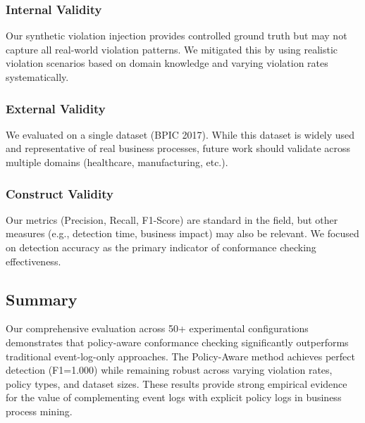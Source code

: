 \subsubsection{Internal Validity}
Our synthetic violation injection provides controlled ground truth but may not capture all real-world violation patterns. We mitigated this by using realistic violation scenarios based on domain knowledge and varying violation rates systematically.

\subsubsection{External Validity}
We evaluated on a single dataset (BPIC 2017). While this dataset is widely used and representative of real business processes, future work should validate across multiple domains (healthcare, manufacturing, etc.).

\subsubsection{Construct Validity}
Our metrics (Precision, Recall, F1-Score) are standard in the field, but other measures (e.g., detection time, business impact) may also be relevant. We focused on detection accuracy as the primary indicator of conformance checking effectiveness.

\subsection{Summary}

Our comprehensive evaluation across 50+ experimental configurations demonstrates that policy-aware conformance checking significantly outperforms traditional event-log-only approaches. The Policy-Aware method achieves perfect detection (F1=1.000) while remaining robust across varying violation rates, policy types, and dataset sizes. These results provide strong empirical evidence for the value of complementing event logs with explicit policy logs in business process mining.
